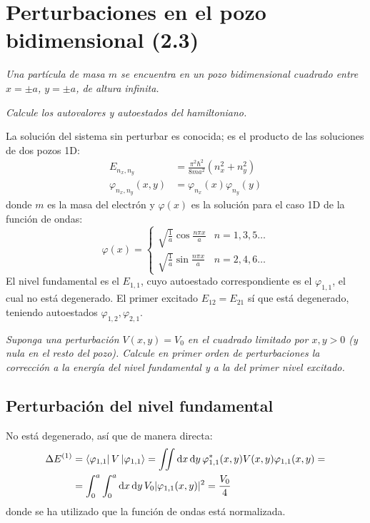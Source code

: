 \chapter{Perturbaciones en el pozo bidimensional (2.3)}
\begin{tcolorbox}[halign=left]
  \emph{Una partícula de masa $m$ se encuentra en un pozo
    bidimensional cuadrado entre ${x=\pm a}$, ${y=\pm a}$, de altura
    infinita.
    }

    \emph{
    Calcule los autovalores y autoestados del hamiltoniano.
}
\end{tcolorbox}
La solución del sistema sin perturbar es conocida; es el producto de
las soluciones de dos pozos 1D:
\begin{align}
  E_{n_x,n_y} &= \frac{\pi^2 \hbar^2}{8ma^2}(n_x^2+n_y^2) \\
  \varphi_{n_x,n_y}(x,y) &= \varphi_{n_x}(x)\varphi_{n_y}(y)
\end{align}
donde $m$ es la masa del electrón y $\varphi(x)$ es la solución para el
caso 1D de la función de ondas:
\begin{equation}
  \varphi(x) =
  \begin{cases}
   \sqrt{\frac{1}{a}} \cos \frac{n\pi x}{a} & n = 1,3,5\ldots \\
   \sqrt{\frac{1}{a}} \sin \frac{n\pi x}{a} & n = 2,4,6\ldots 
  \end{cases}
\end{equation}
El nivel fundamental es el $E_{1,1}$, cuyo autoestado correspondiente
es el $\varphi_{1,1}$, el cual no está degenerado. El primer excitado
$E_{12}=E_{21}$ sí que está degenerado, teniendo autoestados $\varphi_{1,2},\varphi_{2,1}$.
\begin{tcolorbox}[halign=left]
  \emph{Suponga una perturbación $V(x,y)=V_0$ en el cuadrado
    limitado por $x,y>0$ (y nula en el resto del pozo).
    Calcule en primer orden de perturbaciones la corrección a la
    energía del nivel fundamental y a la del primer nivel excitado.}
\end{tcolorbox}
\section{Perturbación del nivel fundamental}
No está degenerado, así que de manera directa:
\begin{equation}
  \begin{split}
    \Delta E^{(1)} &= \bra{\varphi_{1,1}}V\ket{\varphi_{1,1}} = \iint \dd{x}
    \dd{y} \varphi_{1,1}^*(x,y) V(x,y) \varphi_{1,1}(x,y) = \\ 
    &= \int_0^a \int_0^a \dd{x}
    \dd{y} V_0 |\varphi_{1,1}(x,y)|^2 = \frac{V_0}{4}
  \end{split}
\end{equation}
donde se ha utilizado que la función de ondas está normalizada. 
